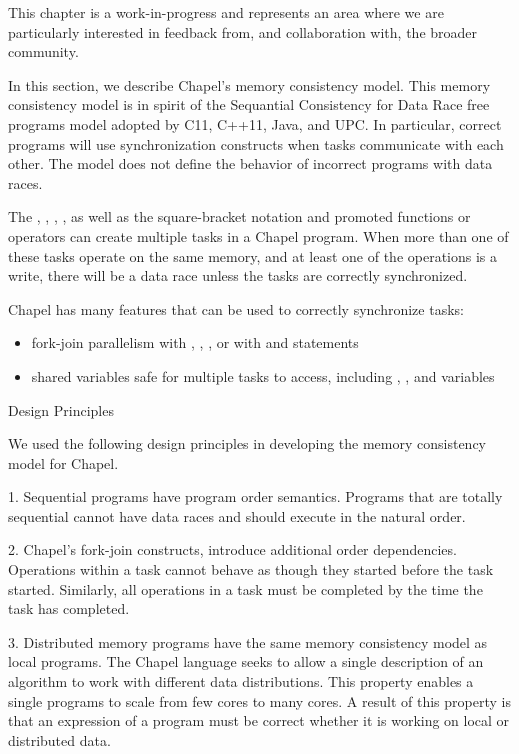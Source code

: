 \label{Memory_Consistency_Model}

\begin{openissue}
  This chapter is a work-in-progress and represents an area where we
  are particularly interested in feedback from, and collaboration
  with, the broader community.
\end{openissue}

In this section, we describe Chapel's memory consistency model. This memory
consistency model is in spirit of the Sequantial Consistency for Data Race free
programs model adopted by C11, C++11, Java, and UPC. In particular, correct
programs will use synchronization constructs when tasks communicate with each
other. The model does not define the behavior of incorrect programs with data
races.

The , , , , as well as
the square-bracket notation and promoted functions or operators can create
multiple tasks in a Chapel program. When more than one of these tasks operate
on the same memory, and at least one of the operations is a write, there will
be a data race unless the tasks are correctly synchronized.

Chapel has many features that can be used to correctly synchronize tasks:
\begin{itemize}
  \item fork-join parallelism with , , , or with  and  statements
  \item shared variables safe for multiple tasks to access, including , , and  variables
\end{itemize}

Design Principles

We used the following design principles in developing the memory consistency
model for Chapel.

1. Sequential programs have program order semantics. Programs that are totally sequential cannot have data races and should execute in the natural order.

2. Chapel's fork-join constructs, introduce additional order dependencies. Operations within a task cannot behave as though they started before the task started. Similarly, all operations in a task must be completed by the time the task has completed.

3. Distributed memory programs have the same memory consistency model as local programs. The Chapel language seeks to allow a single description of an algorithm to work with different data distributions. This property enables a single programs to scale from few cores to many cores. A result of this property is that an expression of a program must be correct whether it is working on local or distributed data.

